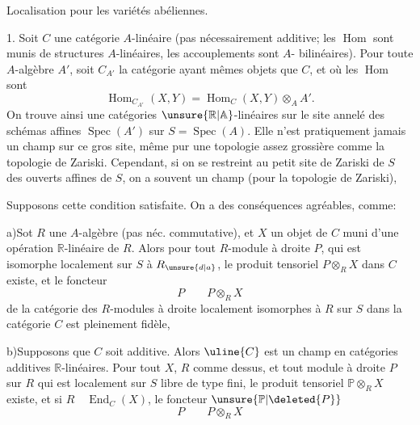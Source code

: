 Localisation pour les variétés abéliennes.

1.\quad {} Soit $C$ une catégorie $A$-linéaire (pas nécessairement additive; les $\operatorname{Hom}$ sont munis de structures $A$-linéaires, les accouplements sont $A$- bilinéaires). Pour toute $A$-algèbre $A'$, soit $C_{A'}$ la catégorie ayant mêmes objets que $C$, et où les $\operatorname{Hom}$ sont
\[
\operatorname{Hom}_{C_{A'}}(X,Y)=\operatorname{Hom}_C(X,Y)\otimes_A A'.
\]
On trouve ainsi une catégories $\unsure{\mathbb{R}|\mathbb{A}}$-linéaires sur le site annelé des schémas affines $\operatorname{Spec}(A')$ sur $S=\operatorname{Spec}(A)$. Elle n'est pratiquement jamais un champ sur ce gros site, même pur une topologie assez grossière comme la topologie de Zariski. Cependant, si on se restreint au petit site de Zariski  de $S$ des ouverts affines de $S$, on a souvent un champ (pour la topologie de Zariski),  

Supposons cette condition satisfaite. On a des conséquences agréables, comme:

a)\quad Sot  $R$ une $A$-algèbre (pas néc. commutative), et $X$ un objet de $C$ muni d'une opération $\mathbb{R}$-linéaire de $R$. Alors pour tout $R$-module à droite $P$, qui est isomorphe localement sur $S$ à $R_{\unsure{d|a}}$, le produit tensoriel $P\otimes_R X$ dans $C$ existe, et  le foncteur
\[
P\qquad P\otimes_R X
\]
de la catégorie  des $R$-modules à droite localement isomorphes à $R$ sur $S$ dans la catégorie $C$ est pleinement fidèle, 

b)\quad Supposons que $C$ soit additive. Alors $\uline{C}$ est un champ en catégories additives $\mathbb{R}$-linéaires. Pour tout $X$, $R$ comme dessus,  et tout module à droite $P$ sur $R$ qui est localement sur $S$ libre de type fini, le produit tensoriel $\mathbb{P}\otimes_R X$ existe, et si $R\quad\operatorname{End}_C(X)$, le foncteur $\unsure{\mathbb{P}|\deleted{P}}$
\[
P\qquad P\otimes_R X
\]

